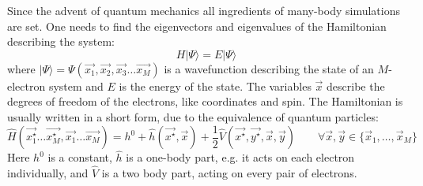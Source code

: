Since the advent of quantum mechanics all ingredients of many-body simulations 
are set. One needs to find the eigenvectors and eigenvalues of the 
Hamiltonian describing the system:
%
\begin{equation}
 H | \Psi \rangle = E | \Psi \rangle
 \label{eq:schroedinger}
\end{equation}
%
where $|\Psi \rangle = \Psi(\vec{x_{1}}, \vec{x_{2}}, \vec{x_{3}}\ldots 
\vec{x_{M}})$ is a wavefunction describing the state of an $M$-electron system 
and $E$ is the energy of the state. The variables $\vec{x}$ describe the 
degrees of freedom of the electrons, like coordinates and spin.
The Hamiltonian is usually written in a short form, due to the 
equivalence of quantum particles:
%
\begin{equation}
 \hat{H}(\vec{x^{\star}_{1}}\ldots 
\vec{x^{\star}_{M}}, \vec{x_{1}}\ldots 
\vec{x_{M}}) = h^{0} + \hat{h}(\vec{x^{\star}}, \vec{x}) + 
\frac{1}{2} \hat{V}(\vec{x^{\star}}, \vec{y^{\star}}, \vec{x}, 
\vec{y}) \qquad \forall \vec{x}, \vec{y} \in \{\vec{x}_{1}, \ldots, \vec{x}_{M} 
\}
\end{equation}
%
Here $h^{0}$ is a constant, $\hat{h}$ is a one-body part, e.g. it acts on each 
electron individually, and $\hat{V}$ is a two body part, acting on every pair 
of electrons. 


